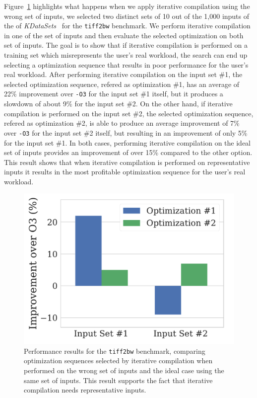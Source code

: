     Figure~\ref{fig:motivation_wrong_inputs} highlights what happens when we apply iterative compilation using the wrong set of inputs, we selected two distinct sets of
    10 out of the 1,000 inputs of the of \textit{KDataSets}~\cite{chen10,chen12a} for the \texttt{tiff2bw} benchmark.
    We perform iterative compilation in one of the set of inputs and then evaluate the selected optimization on both set of inputs.
    The goal is to show that if iterative compilation is performed on a training set which misrepresents the user's real workload,
    the search can end up selecting a optimization sequence that results in poor performance for the user's real workload.
    After performing iterative compilation on the input set \#1, the selected optimization sequence, refered as optimization \#1, has an average of 22\% improvement over \texttt{-O3} for
    the input set \#1 itself, but it produces a slowdown of about 9\% for the input set \#2.
    On the other hand, if iterative compilation is performed on the input set \#2, the selected optimization sequence, refered as optimization \#2, is able to produce an average improvement of 7\% over \texttt{-O3} for the input set \#2 itself, but resulting in an improvement of only 5\% for the input set \#1.
    In both cases, performing iterative compilation on the ideal set of inputs provides an improvement of over 15\% compared to the other option.
    This result shows that when iterative compilation is performed on representative inputs it results in the most profitable optimization sequence for the user's real workload.

\begin{figure}[ht]
    \centering
    \includegraphics[width=0.7\linewidth]{figs/motivation_two_inputs.pdf}
    \caption{Performance results for the \texttt{tiff2bw} benchmark, comparing optimization sequences selected by iterative compilation when performed on the wrong set of inputs and the ideal case using the same set of inputs.
    This result supports the fact that iterative compilation needs representative inputs.}
    \label{fig:motivation_wrong_inputs}
\end{figure}

